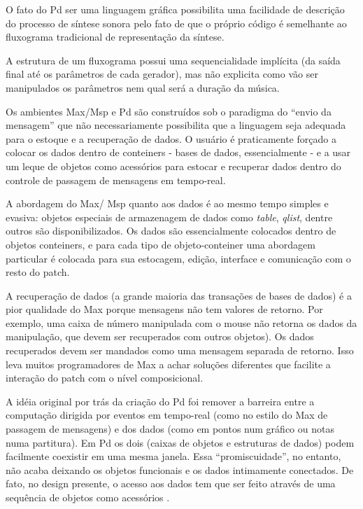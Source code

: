\documentclass[draft]{ppgmus}
\begin{document}
O fato do Pd ser uma linguagem gráfica possibilita uma facilidade de
descrição do processo de síntese sonora pelo fato de que o próprio
código é semelhante ao fluxograma tradicional de representação da
síntese.

 A estrutura de um fluxograma
possui uma sequencialidade implícita (da saída final até os parâmetros
de cada gerador), mas não explicita como vão ser manipulados os
parâmetros nem qual será a duração da música.

Os ambientes Max/Msp e Pd são construídos sob o paradigma do ``envio
da mensagem'' que não necessariamente possibilita que a linguagem seja
adequada para o estoque e a recuperação de dados. O usuário é
praticamente forçado a colocar os dados dentro de conteiners - bases
de dados, essencialmente - e a usar um leque de objetos como
acessórios para estocar e recuperar dados dentro do controle de
passagem de mensagens em tempo-real.

A abordagem do Max/ Msp quanto aos dados é ao mesmo tempo simples e
evasiva: objetos especiais de armazenagem de dados como
\textit{table}, \textit{qlist}, dentre outros são disponibilizados. Os
dados são essencialmente colocados dentro de objetos conteiners, e
para cada tipo de objeto-conteiner uma abordagem particular é colocada
para sua estocagem, edição, interface e comunicação com o resto do
patch.

A recuperação de dados (a grande maioria das transações de bases de
dados) é a pior qualidade do Max porque mensagens não tem valores de
retorno. Por exemplo, uma caixa de número manipulada com o mouse não
retorna os dados da manipulação, que devem ser recuperados com outros
objetos). Os dados recuperados devem ser mandados como uma mensagem
separada de retorno. Isso leva muitos programadores de Max a achar
soluções diferentes que facilite a interação do patch com o nível
composicional.

A idéia original por trás da criação do Pd foi remover a barreira
entre a computação dirigida por eventos em tempo-real (como no estilo
do Max de passagem de mensagens) e dos dados (como em pontos num
gráfico ou notas numa partitura). Em Pd os dois (caixas de objetos e
estruturas de dados) podem facilmente coexistir em uma mesma janela.
Essa ``promiscuidade'', no entanto, não acaba deixando os objetos
funcionais e os dados intimamente conectados. De fato, no design
presente, o acesso aos dados tem que ser feito através de uma
sequência de objetos como acessórios .
\end{document}
